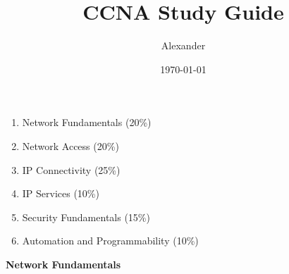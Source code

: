 \documentclass{article}
\title{CCNA Study Guide}
\author{Alexander}
\date{\today}
\begin{document}
\maketitle

\begin{enumerate}
  \item Network Fundamentals (20\%)
  \item Network Access (20\%)
  \item IP Connectivity (25\%)
  \item IP Services (10\%)
  \item Security Fundamentals (15\%)
  \item Automation and Programmability (10\%)\\
\end{enumerate}

\begin{flushleft}\textbf{Network Fundamentals}\end{flushleft}
\end{document}
